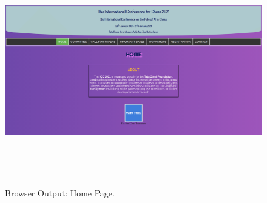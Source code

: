\documentclass[12pt, a4]{article}
\begin{document}
\newpage
\subsection*{}
\begin{flushleft}

\end{flushleft}

\newpage
\subsection*{}
\begin{flushleft}

\end{flushleft}



\newpage
\subsection*{}
\begin{flushleft}

\end{flushleft}

\newpage
\subsection*{}
\begin{figure}[h]
\centering
\caption{Browser Output: Home Page.}
\includegraphics[height=10cm, width=18cm, keepaspectratio]{Output/Home.png}
\end{figure}
\end{document}
